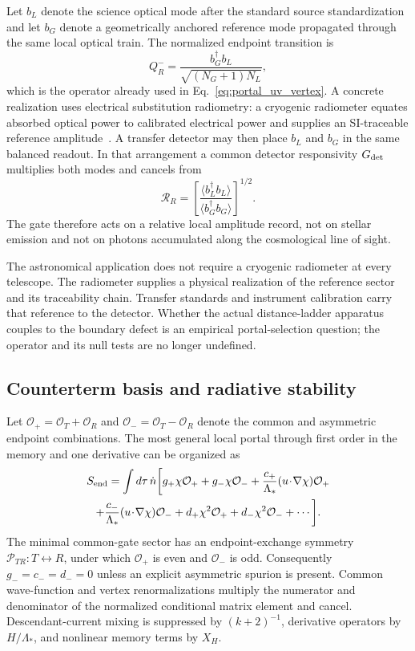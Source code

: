 \documentclass[aps,prd,twocolumn,10pt,superscriptaddress,nofootinbib]{revtex4-2}
\begin{document}
Let $b_L$ denote the science optical mode after the standard source
standardization and let $b_G$ denote a geometrically anchored reference mode
propagated through the same local optical train.  The normalized endpoint
transition is
\begin{equation}
 Q_R^-=\frac{b_G^{\dagger}b_L}
 {\sqrt{(N_G+1)N_L}},
 \label{eq:pb_radiometric_transition_concrete}
\end{equation}
which is the operator already used in
Eq.~\eqref{eq:portal_uv_vertex}.  A concrete realization uses electrical
substitution radiometry: a cryogenic radiometer equates absorbed optical
power to calibrated electrical power and supplies an SI-traceable reference
amplitude~\cite{NISTPOWR,Gentile1996}.  A transfer detector may then place
$b_L$ and $b_G$ in the same balanced readout.  In that arrangement a common
detector responsivity $G_{\rm det}$ multiplies both modes and cancels from
\begin{equation}
 \mathcal R_R
 =\left[\frac{\langle b_L^{\dagger}b_L\rangle}
 {\langle b_G^{\dagger}b_G\rangle}\right]^{1/2}.
 \label{eq:pb_concrete_radiometric_ratio}
\end{equation}
The gate therefore acts on a relative local amplitude record, not on stellar
emission and not on photons accumulated along the cosmological line of
sight.

The astronomical application does not require a cryogenic radiometer at
every telescope.  The radiometer supplies a physical realization of the
reference sector and its traceability chain.  Transfer standards and
instrument calibration carry that reference to the detector.  Whether the
actual distance-ladder apparatus couples to the boundary defect is an
empirical portal-selection question; the operator and its null tests are no
longer undefined.

\subsection{Counterterm basis and radiative stability}

Let $\mathcal O_+=\mathcal O_T+\mathcal O_R$ and
$\mathcal O_-=\mathcal O_T-\mathcal O_R$ denote the common and asymmetric
endpoint combinations.  The most general local portal through first order
in the memory and one derivative can be organized as
\begin{multline}
 S_{\rm end}=\int d\tau\,\dot n\bigg[
 g_+\chi\mathcal O_+ +g_-\chi\mathcal O_-
 +\frac{c_+}{\Lambda_*}(u\!\cdot\!\nabla\chi)\mathcal O_+\\
 +\frac{c_-}{\Lambda_*}(u\!\cdot\!\nabla\chi)\mathcal O_-
 +d_+\chi^2\mathcal O_+ +d_-\chi^2\mathcal O_-+\cdots\bigg].
 \label{eq:pb_counterterm_basis}
\end{multline}
The minimal common-gate sector has an endpoint-exchange symmetry
$\mathcal P_{TR}:T\leftrightarrow R$, under which
$\mathcal O_+$ is even and $\mathcal O_-$ is odd.  Consequently $g_-=c_-=d_-=0$
unless an explicit asymmetric spurion is present.  Common wave-function and
vertex renormalizations multiply the numerator and denominator of the
normalized conditional matrix element and cancel.  Descendant-current
mixing is suppressed by $(k+2)^{-1}$, derivative operators by
$H/\Lambda_*$, and nonlinear memory terms by $X_H$.
\end{document}
